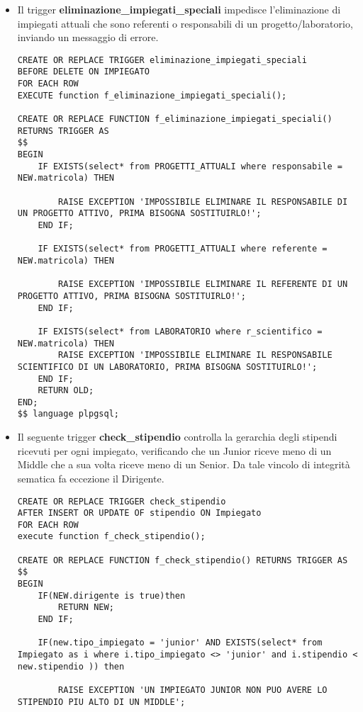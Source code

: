 \begin{itemize}
\normalsize
\item Il trigger \textbf{eliminazione\_impiegati\_speciali} impedisce l'eliminazione di impiegati attuali che sono referenti o responsabili di un progetto/laboratorio, inviando un messaggio di errore.
\scriptsize
\begin{lstlisting}
CREATE OR REPLACE TRIGGER eliminazione_impiegati_speciali
BEFORE DELETE ON IMPIEGATO
FOR EACH ROW
EXECUTE function f_eliminazione_impiegati_speciali();

CREATE OR REPLACE FUNCTION f_eliminazione_impiegati_speciali() RETURNS TRIGGER AS
$$
BEGIN
	IF EXISTS(select* from PROGETTI_ATTUALI where responsabile = NEW.matricola) THEN

    	RAISE EXCEPTION 'IMPOSSIBILE ELIMINARE IL RESPONSABILE DI UN PROGETTO ATTIVO, PRIMA BISOGNA SOSTITUIRLO!';
	END IF;

	IF EXISTS(select* from PROGETTI_ATTUALI where referente = NEW.matricola) THEN

    	RAISE EXCEPTION 'IMPOSSIBILE ELIMINARE IL REFERENTE DI UN PROGETTO ATTIVO, PRIMA BISOGNA SOSTITUIRLO!';
	END IF;

	IF EXISTS(select* from LABORATORIO where r_scientifico = NEW.matricola) THEN
    	RAISE EXCEPTION 'IMPOSSIBILE ELIMINARE IL RESPONSABILE SCIENTIFICO DI UN LABORATORIO, PRIMA BISOGNA SOSTITUIRLO!';
	END IF;
	RETURN OLD;
END;
$$ language plpgsql;
\end{lstlisting}

\newpage    
\normalsize
\item Il seguente trigger \textbf{check\_stipendio} controlla la gerarchia degli stipendi ricevuti per ogni impiegato, verificando che un Junior riceve meno di un Middle che a sua volta riceve meno di un Senior. Da tale vincolo di integrità sematica fa eccezione il Dirigente.
\scriptsize
\begin{lstlisting}
CREATE OR REPLACE TRIGGER check_stipendio
AFTER INSERT OR UPDATE OF stipendio ON Impiegato
FOR EACH ROW
execute function f_check_stipendio();

CREATE OR REPLACE FUNCTION f_check_stipendio() RETURNS TRIGGER AS
$$
BEGIN
	IF(NEW.dirigente is true)then
		RETURN NEW;
	END IF;

	IF(new.tipo_impiegato = 'junior' AND EXISTS(select* from Impiegato as i where i.tipo_impiegato <> 'junior' and i.stipendio < new.stipendio )) then

		RAISE EXCEPTION 'UN IMPIEGATO JUNIOR NON PUO AVERE LO STIPENDIO PIU ALTO DI UN MIDDLE';
	

\end{lstlisting}
\end{itemize}
